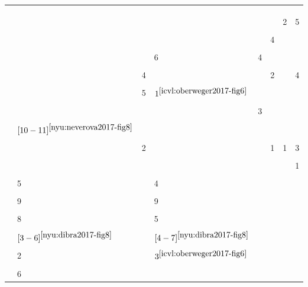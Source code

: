 {\begin{longtable}{| l | l | l | l | l | l | l | l |}
\hline & & & & & & & \\[-1.2em]
%
\cite{poier2015hybrid} & &	&	&	&	&	&	\\
\hline & & & & & & & \\[-1.2em]
%
\cite{sharp2015accurate} & &	&	&	&	&	2&	5\\
\hline & & & & & & & \\[-1.2em]
%
\cite{sridhar2015fast} & &	&	&	&	4&	&	\\
\hline & & & & & & & \\[-1.2em]
%
\cite{sun2015cascaded} & &	&	6&	4&	&	&	\\
\hline & & & & & & & \\[-1.2em]
%
\cite{tagliasacchi2015robust} &&	4&	&	&	2&	&	4 \\
\hline & & & & & & & \\[-1.2em]
%
\cite{tang2015opening} & &	5&	$1^{\ref{icvl:oberweger2017-fig6}}$ &	&	&	&	\\
\hline & & & & & & & \\[-1.2em]
%
\cite{ge2016robust} & &	&	&	3&	&	&	 \\
\hline & & & & & & & \\[-1.2em]
%
\cite{sinha2016deephand} & $[10-11]^{\ref{nyu:neverova2017-fig8} }$ &	&	&	&	&	&	\\
\hline & & & & & & & \\[-1.2em]
%
\cite{taylor2016concerto} & &	2&	&	&	1&	1&	3 \\
\hline & & & & & & & \\[-1.2em]
%
\cite{tkach2016sphere} & &	&	&	&	&	&	1\\
\hline & & & & & & & \\[-1.2em]
%
\cite{wan2016hand} & 5&	&	4&	&	&	&	\\
\hline & & & & & & & \\[-1.2em]
%
\cite{zhou2016model} &9&	&	9&	&	&	&	 \\
\hline & & & & & & & \\[-1.2em]
%
\cite{fourure2017multi} & 8&	&	5&	&	&	&	 \\
\hline & & & & & & & \\[-1.2em]
%
\cite{dibra2017refine} & $[3-6]^{\ref{nyu:dibra2017-fig8}}$ &	&	$[4-7]^{\ref{nyu:dibra2017-fig8}}$ &	&	&	&	\\
\hline & & & & & & & \\[-1.2em]
%
\cite{guo2017region} & 2&	&	$3^{\ref{icvl:oberweger2017-fig6}}$ &	&	&	&	\\
\hline & & & & & & & \\[-1.2em]
%
\cite{madadi2017end} & 6&	&	&	&	&	&	\\

\end{longtable}}
